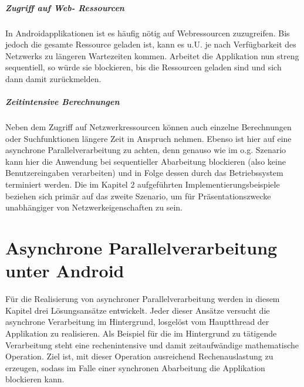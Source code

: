 \documentclass[12pt,oneside,a4paper,bibtotoc,liststotoc]{scrreprt}
\begin{document}
\paragraph{Zugriff auf Web- Ressourcen} 
In Androidapplikationen ist es häufig nötig auf Webressourcen zuzugreifen. Bis jedoch die gesamte Ressource geladen ist, kann es u.U. je nach Verfügbarkeit des Netzwerks zu längeren Wartezeiten kommen. Arbeitet die Applikation nun streng sequentiell, so würde sie blockieren, bis die Ressourcen geladen sind und sich dann damit zurückmelden.
\paragraph{Zeitintensive Berechnungen}
Neben dem Zugriff auf Netzwerkressourcen können auch einzelne Berechnungen oder Suchfunktionen längere Zeit in Anspruch nehmen. Ebenso ist hier auf eine asynchrone Parallelverarbeitung zu achten, denn genauso wie im o.g. Szenario kann hier die Anwendung bei sequentieller Abarbeitung blockieren (also keine Benutzereingaben verarbeiten) und in Folge dessen durch das Betriebssystem terminiert werden. 
\newline
Die im Kapitel 2 aufgeführten Implementierungsbeispiele beziehen sich primär auf das zweite Szenario, um für Präsentationszwecke unabhängiger von Netzwerkeigenschaften zu sein.


\chapter{Asynchrone Parallelverarbeitung unter Android}
Für die Realisierung von asynchroner Parallelverarbeitung werden in diesem Kapitel drei Lösungsansätze entwickelt. Jeder dieser Ansätze versucht die asynchrone Verarbeitung im Hintergrund, losgelöst vom Hauptthread der Applikation zu realisieren. Als Beispiel für die im Hintergrund zu tätigende Verarbeitung steht eine rechenintensive und damit zeitaufwändige mathematische Operation. Ziel ist, mit dieser Operation ausreichend Rechenauslastung zu erzeugen, sodass im Falle einer synchronen Abarbeitung die Applikation blockieren kann.
\end{document}
